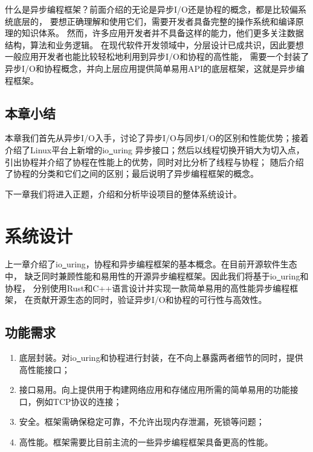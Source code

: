 \documentclass[supercite]{HustGraduPaper}
\theoremstyle{definition}
\begin{document}
什么是异步编程框架？前面介绍的无论是异步I/O还是协程的概念，都是比较偏系统底层的，
要想正确理解和使用它们，需要开发者具备完整的操作系统和编译原理的知识体系。
然而，许多应用开发者并不具备这样的能力，他们更多关注数据结构，算法和业务逻辑。
在现代软件开发领域中，分层设计已成共识，因此要想一般应用开发者也能比较轻松地利用到异步I/O和协程的高性能，
需要一个封装了异步I/O和协程概念，并向上层应用提供简单易用API的底层框架，这就是异步编程框架。\par

\subsection{本章小结}

本章我们首先从异步I/O入手，讨论了异步I/O与同步I/O的区别和性能优势；接着介绍了Linux平台上新增的io\underline{~}uring
异步接口；然后以线程切换开销大为切入点，引出协程并介绍了协程在性能上的优势，同时对比分析了线程与协程；
随后介绍了协程的分类和它们之间的区别；最后说明了异步编程框架的概念。\par

下一章我们将进入正题，介绍和分析毕设项目的整体系统设计。\par

\section{系统设计}
上一章介绍了io\underline{~}uring，协程和异步编程框架的基本概念。在目前开源软件生态中，
缺乏同时兼顾性能和易用性的开源异步编程框架。因此我们将基于io\underline{~}uring和协程，
分别使用Rust和C++语言设计并实现一款简单易用的高性能异步编程框架，
在贡献开源生态的同时，验证异步I/O和协程的可行性与高效性。\par

\subsection{功能需求}

\begin{enumerate}
  \item 底层封装。对io\underline{~}uring和协程进行封装，在不向上暴露两者细节的同时，提供高性能接口；
  \item 接口易用。向上提供用于构建网络应用和存储应用所需的简单易用的功能接口，例如TCP协议的连接；
  \item 安全。框架需确保稳定可靠，不允许出现内存泄漏，死锁等问题；
  \item 高性能。框架需要比目前主流的一些异步编程框架具备更高的性能。
\end{enumerate}
\end{document}

